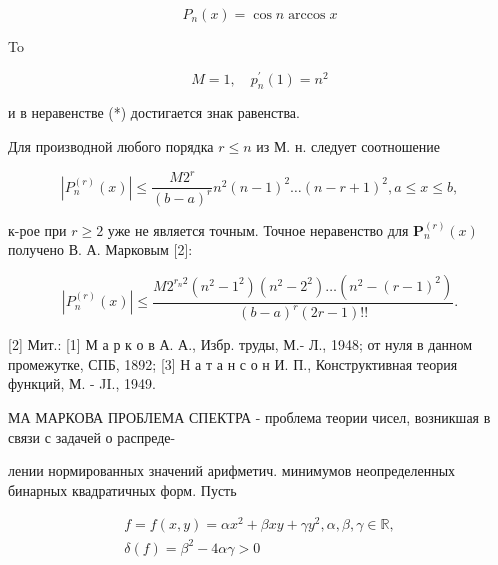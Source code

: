 \documentclass[10pt]{article}
\begin{document}
\[

P_{n}(x)=\cos n \arccos x

\]



To



\[

M=1, \quad p_{n}^{\prime}(1)=n^{2}

\]



и в неравенстве (*) достигается знак равенства.



Для производной любого порядка $r \leqslant n$ из М. н. следует соотношение



\[

\left|P_{n}^{(r)}(x)\right| \leqslant \frac{M 2^{r}}{(b-a)^{r}} n^{2}(n-1)^{2} \ldots(n-r+1)^{2}, a \leqslant x \leqslant b,

\]



к-рое при $r \geqslant 2$ уже не является точным. Точное неравенство для $\boldsymbol{P}_{n}^{(r)}(x)$ получено В. А. Марковым [2]:



\[

\left|P_{n}^{(r)}(x)\right| \leqslant \frac{M 2^{r_{n} 2}\left(n^{2}-1^{2}\right)\left(n^{2}-2^{2}\right) \ldots\left(n^{2}-(r-1)^{2}\right)}{(b-a)^{r}(2 r-1) ! !} .

\]



[2] Мит.: [1] М а р к о в А. А., Избр. труды, М.- Л., 1948; от нуля в данном промежутке, СПБ, 1892; [3] Н а т а н с о н И. П., Конструктивная теория функций, М. - JI., 1949.



МА МАРКОВА ПРОБЛЕМА СПЕКТРА - проблема теории чисел, возникшая в связи с задачей о распреде-

лении нормированных значений арифметич. минимумов неопределенных бинарных квадратичных форм. Пусть



\[

\begin{gathered}

f=f(x, y)=\alpha x^{2}+\beta x y+\gamma y^{2}, \alpha, \beta, \gamma \in \mathbb{R}, \\

\delta(f)=\beta^{2}-4 \alpha \gamma>0

\end{gathered}

\]
\end{document}
